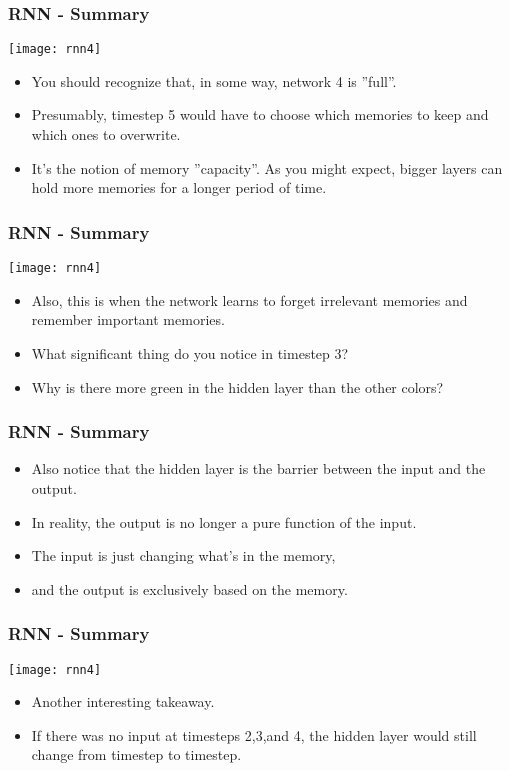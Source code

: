 \begin{frame}[fragile] \frametitle{RNN - Summary}
\begin{center}
\texttt{[image: rnn4]}
\end{center}
\begin{itemize}
\item You should recognize that, in some way, network 4 is ''full''. 
\item Presumably, timestep 5 would have to choose which memories to keep and which ones to overwrite. 
\item It's the notion of memory ''capacity''. As you might expect, bigger layers can hold more memories for a longer period of time.
\end{itemize}
\end{frame}

\begin{frame}[fragile] \frametitle{RNN - Summary}
\begin{center}
\texttt{[image: rnn4]}
\end{center}
\begin{itemize}
\item Also, this is when the network learns to forget irrelevant memories and remember important memories. 
\item What significant thing do you notice in timestep 3? 
\item Why is there more green in the hidden layer than the other colors?
\end{itemize}
\end{frame}

\begin{frame}[fragile] \frametitle{RNN - Summary}
\begin{itemize}
\item Also notice that the hidden layer is the barrier between the input and the output. 
\item In reality, the output is no longer a pure function of the input. 
\item The input is just changing what's in the memory, 
\item and the output is exclusively based on the memory. 
\end{itemize}
\end{frame}

\begin{frame}[fragile] \frametitle{RNN - Summary}
\begin{center}
\texttt{[image: rnn4]}
\end{center}
\begin{itemize}
\item Another interesting takeaway. 
\item If there was no input at timesteps 2,3,and 4, the hidden layer would still change from timestep to timestep. 
\end{itemize}
\end{frame}


